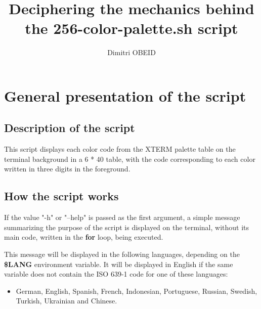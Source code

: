 \documentclass[a4paper,10pt]{article}
\title{\color{sec1}Deciphering the mechanics behind the \textbf{\color{sec2}256-color-palette.sh} script}\color{text}
\author{Dimitri OBEID}
\begin{document}
    \maketitle
    \newpage

    \hypertarget{contents}{}
    \tableofcontents
    \newpage

\color{sec1}
    \section{General presentation of the script}\color{text}

    \color{sec2}
    \subsection{Description of the script}\color{text}

    \begin{justify}
        This script displays each color code from the XTERM palette table on the terminal background in a 6 * 40 table, with the code corresponding to each color written in three digits in the foreground.
    \end{justify}




    \color{sec2}
    \subsection{How the script works}\color{text}

    \begin{justify}
        If the value "-h" or "--help" is passed as the first argument, a simple message summarizing the purpose of the script is displayed on the terminal, without its main code, written in the \textbf{\color{loop}for} loop, being executed.
    \end{justify}

    \begin{justify}
        This message will be displayed in the following languages, depending on the \textbf{\color{vars}\$LANG} environment variable. It will be displayed in English if the same variable does not contain the ISO 639-1 code for one of these languages:
    \end{justify}

    \begin{justify}
        \begin{itemize}
            \item German, English, Spanish, French, Indonesian, Portuguese, Russian, Swedish, Turkish, Ukrainian and Chinese.
        \end{itemize}

    \end{justify}
\end{document}
